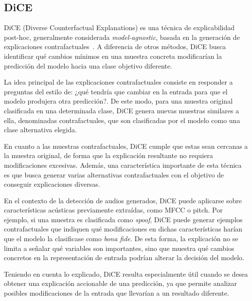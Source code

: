 \subsection{DiCE}
\label{subsubsec:eda_dice}

DiCE (Diverse Counterfactual Explanations) es una técnica de explicabilidad post-hoc, generalmente considerada \textit{model-agnostic}, basada en la generación de explicaciones contrafactuales~\parencite{2020dice}. A diferencia de otros métodos, DiCE busca identificar qué cambios mínimos en una muestra concreta modificarían la predicción del modelo hacia una clase objetivo diferente.

La idea principal de las explicaciones contrafactuales consiste en responder a preguntas del estilo de: ¿qué tendría que cambiar en la entrada para que el modelo produjera otra predicción?. De este modo, para una muestra original clasificada en una determinada clase, DiCE genera nuevas muestras similares a ella, denominadas contrafactuales, que son clasificadas por el modelo como una clase alternativa elegida.

En cuanto a las muestras contrafactuales, DiCE cumple que estas sean cercanas a la muestra original, de forma que la explicación resultante no requiera modificaciones excesivas. Además, una característica importante de esta técnica es que busca generar varias alternativas contrafactuales con el objetivo de conseguir explicaciones diversas.

En el contexto de la detección de audios generados, DiCE puede aplicarse sobre características acústicas previamente extraídas, como MFCC o pitch. Por ejemplo, si una muestra es clasificada como \textit{spoof}, DiCE puede generar ejemplos contrafactuales que indiquen qué modificaciones en dichas características harían que el modelo la clasificase como \textit{bona fide}. De esta forma, la explicación no se limita a señalar qué variables son importantes, sino que muestra qué cambios concretos en la representación de entrada podrían alterar la decisión del modelo.

Teniendo en cuenta lo explicado, DiCE resulta especialmente útil cuando se desea obtener una explicación accionable de una predicción, ya que permite analizar posibles modificaciones de la entrada que llevarían a un resultado diferente.